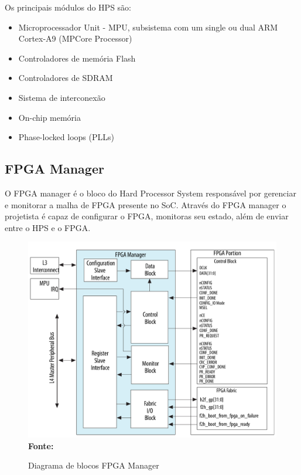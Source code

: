 Os principais módulos do HPS são:

\begin{itemize}
    \item Microprocessador Unit - MPU, subsistema com um single ou dual ARM Cortex-A9 (MPCore Processor)
    \item Controladores de memória Flash
    \item Controladores de SDRAM
    \item Sistema de interconexão
    \item On-chip memória 
    \item Phase-locked loops (PLLs) 
\end{itemize}


\subsection{FPGA Manager}
O FPGA manager é o bloco do Hard Processor System responsável por gerenciar e monitorar a malha de FPGA presente no SoC. Através do FPGA manager o projetista é capaz de configurar o FPGA, monitoras seu estado, além de enviar entre o HPS e o FPGA\@. 

\begin{figure}[ht]
	\caption{Diagrama de blocos FPGA Manager }
	\begin{center}
		\includegraphics[scale=0.3]{imagens/fpgamanager.png}\\
		{\small \textbf{Fonte:} }
    \end{center}\label{fig:fpgamanager}
\end{figure}

